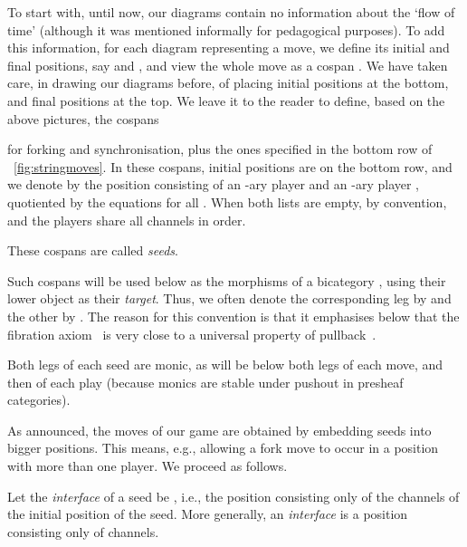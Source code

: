 \documentclass{LMCS}
\theoremstyle{plain}\newtheorem{satz}[thm]{Satz}
\begin{document}
To start with, until now, our diagrams contain no information about
the `flow of time' (although it was mentioned informally for
pedagogical purposes). To add this information, for each diagram 
representing a move, we define its initial and final positions, say
 and , and view the whole move as a cospan . We have taken care, in drawing our diagrams before, of placing
initial positions at the bottom, and final positions at the top.  We
leave it to the reader to define, based on the above pictures, the
cospans
for forking and synchronisation, plus the ones specified in the bottom
row of \figurename~\ref{fig:stringmoves}.  In these cospans, initial
positions are on the bottom row, and we denote by
 the position
consisting of an -ary player  and an -ary player ,
quotiented by the equations  for
all . When both lists are empty, by convention,  and the
players share all channels in order.
\begin{defi}
  These cospans are called \emph{seeds}. 
\end{defi} 
\begin{rem}
  Such cospans will be used below as the morphisms of a bicategory
  , using their lower object as their \emph{target}. Thus, we
  often denote the corresponding leg by  and the other by .  The
  reason for this convention is that it emphasises below that the
  fibration axiom~ is very close to a universal
  property of pullback~\cite{Jacobs}.
\end{rem}
\begin{rem}
  Both legs of each seed are monic, as will be below both legs of each
  move, and then of each play (because monics are stable under pushout
  in presheaf categories).
\end{rem}

As announced, the moves of our game are obtained by embedding seeds
into bigger positions. This means, e.g., allowing a fork move to occur
in a position with more than one player. We proceed as follows.
\begin{defi}\label{def:interface}
  Let the \emph{interface} of a seed  be , i.e., the position consisting only of the
  channels of the initial position of the seed.  More generally, an
  \emph{interface} is a position consisting only of channels.
\end{defi}
\end{document}
